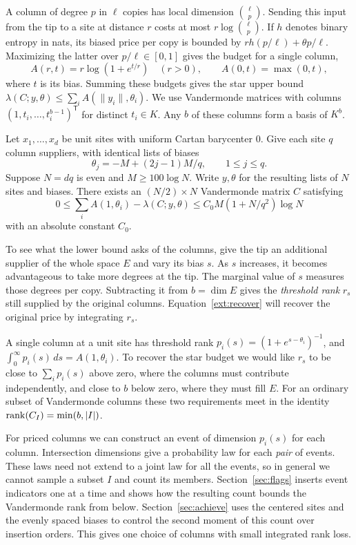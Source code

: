 A column of degree $p$ in $\ell$ copies has local dimension
$\binom{\ell}{p}$. Sending this input from the tip to a site at
distance $r$ costs at most $r\log\binom{\ell}{p}$. If $h$ denotes
binary entropy in nats, its biased price per copy is bounded by
$rh(p/\ell)+\theta p/\ell$. Maximizing the latter over $p/\ell\in[0,1]$
gives the budget for a single column,
\[
 A(r,t)=r\log(1+e^{t/r})\quad(r>0),\qquad
 A(0,t)=\max(0,t),
\]
where $t$ is its bias. Summing these budgets gives the star upper bound
$\lambda(C;y,\theta)\le\sum_i A(\|y_i\|,\theta_i)$.
We use Vandermonde matrices with columns
$(1,t_i,\ldots,t_i^{b-1})^{\mathsf T}$ for distinct $t_i\in K$.
Any $b$ of these columns form a basis of $K^b$.

\begin{theorem}\leavevmode{}\label{ext:star}
Let $x_1,\ldots,x_d$ be unit sites with uniform Cartan barycenter $0$.
Give each site $q$ column suppliers, with identical lists of biases
\[
 \theta_j=-M+(2j-1)M/q,\qquad 1\le j\le q.
\]
Suppose $N=dq$ is even and $M\ge100\log N$. Write $y,\theta$ for
the resulting lists of $N$ sites and biases. There exists an
$(N/2)\times N$ Vandermonde matrix $C$ satisfying
\[
 0\le \sum_i A(1,\theta_i)-\lambda(C;y,\theta)
       \le C_0 M(1+N/q^2)\log N
\]
with an absolute constant $C_0$.
\end{theorem}

To see what the lower bound asks of the columns, give the tip an
additional supplier of the whole space $E$ and vary its bias $s$.
As $s$ increases, it becomes advantageous to take more degrees at
the tip. The marginal value of $s$ measures those degrees per copy.
Subtracting it from $b=\dim E$ gives the \emph{threshold rank} $r_s$
still supplied by the original columns. Equation~\eqref{ext:recover}
will recover the original price by integrating $r_s$.

A single column at a unit site has threshold rank
$p_i(s)=(1+e^{s-\theta_i})^{-1}$, and
$\int_0^\infty p_i(s)\,ds=A(1,\theta_i)$. To recover the star budget
we would like $r_s$ to be close to $\sum_i p_i(s)$ above zero, where
the columns must contribute independently, and close to $b$ below
zero, where they must fill $E$. For an ordinary subset of Vandermonde
columns these two requirements meet in the identity
$\operatorname{rank}(C_I)=\min(b,|I|)$.

For priced columns we can construct an event of dimension $p_i(s)$ for
each column. Intersection dimensions give a probability law for each
\emph{pair} of events. These laws need not extend to a joint law for all
the events, so in general we cannot sample a subset $I$ and count its
members. Section~\ref{sec:flags} inserts event indicators one at a
time and shows how the resulting count bounds the Vandermonde rank from
below.
Section~\ref{sec:achieve} uses the centered sites and the evenly spaced
biases to control the second moment of this count over insertion orders.
This gives one choice of columns with small integrated rank loss.


